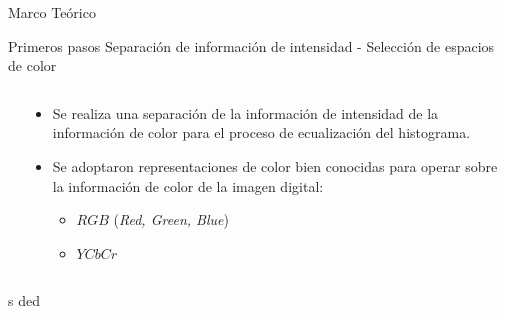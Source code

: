 \documentclass[usenames,dvipsnames]{beamer}
\begin{document}
\begin{frame}{Marco Teórico}
\begin{alertblock}{Primeros pasos}
Separación de información de intensidad - Selección de espacios de color
\end{alertblock}
\begin{columns}[t]
\begin{column}{.3\textwidth}
\end{column}
\begin{column}{.7\textwidth}
\begin{itemize}
	\item Se realiza una separación de la información de intensidad de la información de color para el proceso de ecualización del histograma.
	\item Se adoptaron representaciones de color bien conocidas para operar sobre la información de color de la imagen digital:
	\begin{itemize}
		\item $RGB$ (\textit{Red, Green, Blue})
		\item $YCbCr$
	\end{itemize}
\end{itemize}
\end{column}
\end{columns}
s ded
\end{frame}






\end{document}
